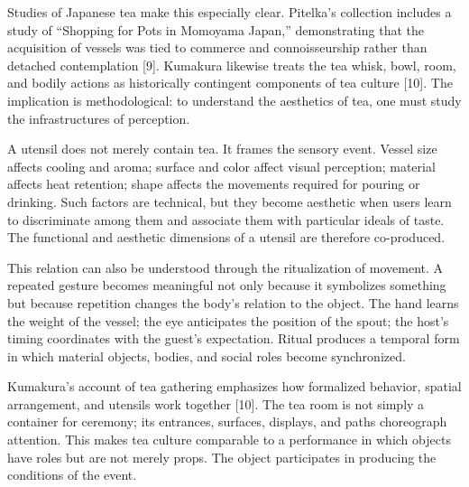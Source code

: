 \documentclass[11pt,a4paper]{article}
\begin{document}
Studies of Japanese tea make this especially clear. Pitelka's collection includes a study of ``Shopping for Pots in Momoyama Japan,'' demonstrating that the acquisition of vessels was tied to commerce and connoisseurship rather than detached contemplation [9]. Kumakura likewise treats the tea whisk, bowl, room, and bodily actions as historically contingent components of tea culture [10]. The implication is methodological: to understand the aesthetics of tea, one must study the infrastructures of perception.

A utensil does not merely contain tea. It frames the sensory event. Vessel size affects cooling and aroma; surface and color affect visual perception; material affects heat retention; shape affects the movements required for pouring or drinking. Such factors are technical, but they become aesthetic when users learn to discriminate among them and associate them with particular ideals of taste. The functional and aesthetic dimensions of a utensil are therefore co-produced.

This relation can also be understood through the ritualization of movement. A repeated gesture becomes meaningful not only because it symbolizes something but because repetition changes the body's relation to the object. The hand learns the weight of the vessel; the eye anticipates the position of the spout; the host's timing coordinates with the guest's expectation. Ritual produces a temporal form in which material objects, bodies, and social roles become synchronized.

Kumakura's account of tea gathering emphasizes how formalized behavior, spatial arrangement, and utensils work together [10]. The tea room is not simply a container for ceremony; its entrances, surfaces, displays, and paths choreograph attention. This makes tea culture comparable to a performance in which objects have roles but are not merely props. The object participates in producing the conditions of the event.
\end{document}
